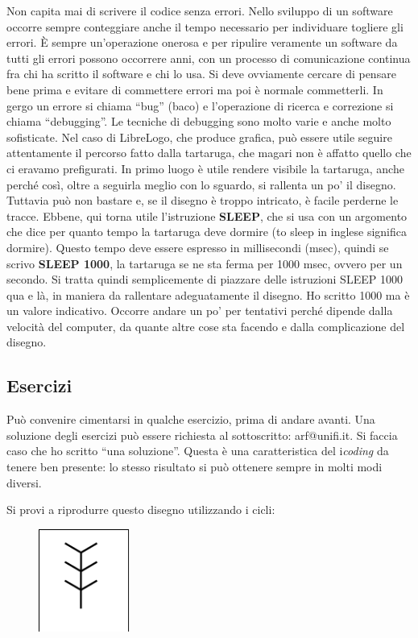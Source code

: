 Non capita mai di scrivere il codice senza errori. Nello sviluppo di un software occorre sempre conteggiare anche il tempo necessario per individuare togliere gli errori. È sempre un'operazione onerosa e per ripulire veramente un software da tutti gli errori possono occorrere anni, con un processo di comunicazione continua fra chi ha scritto il software e chi lo usa. Si deve ovviamente cercare di pensare bene prima e evitare di commettere errori ma poi è normale commetterli. In gergo un errore si chiama “bug” (baco) e l'operazione di ricerca e correzione si chiama “debugging”. Le tecniche di debugging sono molto varie e anche molto sofisticate. Nel caso di LibreLogo, che produce grafica, può essere utile seguire attentamente il percorso fatto dalla tartaruga, che magari non è affatto quello che ci eravamo prefigurati. In primo luogo è utile rendere visibile la tartaruga, anche perché così, oltre a seguirla meglio con lo sguardo, si rallenta un po' il disegno. Tuttavia può non bastare e, se il disegno è troppo intricato, è facile perderne le tracce. Ebbene, qui torna utile l'istruzione \textbf{SLEEP}, che si usa con un argomento che dice per quanto tempo la tartaruga deve dormire (to sleep in inglese significa dormire). Questo tempo deve essere espresso in millisecondi (msec), quindi se scrivo \textbf{SLEEP 1000}, la tartaruga se ne sta ferma per 1000 msec, ovvero per un secondo. Si tratta quindi semplicemente di piazzare delle istruzioni SLEEP 1000 qua e là, in maniera da rallentare adeguatamente il disegno. Ho scritto 1000 ma è un valore indicativo. Occorre andare un po' per tentativi perché dipende dalla velocità del computer, da quante altre cose sta facendo e dalla complicazione del disegno. 

\subsection{Esercizi}

Può convenire cimentarsi in qualche esercizio, prima di andare avanti. Una soluzione degli esercizi può essere richiesta al sottoscritto: arf@unifi.it. Si faccia caso che ho scritto “una soluzione”. Questa è una caratteristica del i\textit{coding} da tenere ben presente: lo stesso risultato si può ottenere sempre in molti modi diversi.

\begin{minipage}{0.40\textwidth}
Si provi a riprodurre questo disegno utilizzando i cicli:                         
\end{minipage}
\begin{minipage}{0.4\textwidth}
\begin{figure}[H]
   \includegraphics[width=3.0cm,trim=4 4 8 4,clip]{./images/ripetere/ripetere-8.png}
   \label{rip-8}
\end{figure}
\end{minipage} \hfill

